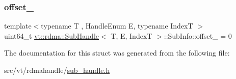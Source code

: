 \subsubsection{\texorpdfstring{offset\+\_\+}{offset\_}}
{\footnotesize\ttfamily template$<$typename T , Handle\+Enum E, typename IndexT $>$ \\
uint64\+\_\+t \hyperlink{structvt_1_1rdma_1_1_sub_handle}{vt\+::rdma\+::\+Sub\+Handle}$<$ T, E, IndexT $>$\+::Sub\+Info\+::offset\+\_\+ = 0}



The documentation for this struct was generated from the following file\+:\begin{DoxyCompactItemize}
\item 
src/vt/rdmahandle/\hyperlink{sub__handle_8h}{sub\+\_\+handle.\+h}\end{DoxyCompactItemize}
